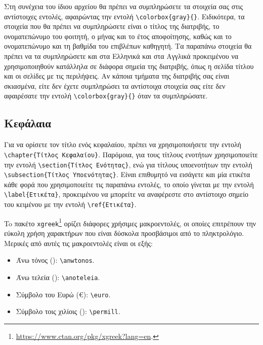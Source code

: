 Στη συνέχεια του ίδιου αρχείου θα πρέπει να συμπληρώσετε τα στοιχεία σας στις αντίστοιχες εντολές, αφαιρώντας την εντολή \verb|\colorbox{gray}{}|.
Ειδικότερα, τα στοιχεία που θα πρέπει να συμπληρώσετε είναι ο τίτλος της διατριβής, το ονοματεπώνυμο του φοιτητή, ο μήνας και το έτος αποφοίτησης, καθώς και το ονοματεπώνυμο και τη βαθμίδα του επιβλέπων καθηγητή.
Τα παραπάνω στοιχεία θα πρέπει να τα συμπληρώσετε και στα Ελληνικά και στα Αγγλικά προκειμένου να χρησιμοποιηθούν κατάλληλα σε διάφορα σημεία της διατριβής, όπως η σελίδα τίτλου και οι σελίδες με τις περιλήψεις.
Αν κάποια τμήματα της διατριβής σας είναι σκιασμένα, είτε δεν έχετε συμπληρώσει τα αντίστοιχα στοιχεία σας είτε δεν αφαιρέσατε την εντολή \verb|\colorbox{gray}{}| όταν τα συμπληρώσατε.

\subsection{Κεφάλαια}
\label{subsec:Chapters}
Για να ορίσετε τον τίτλο ενός κεφαλαίου, πρέπει να χρησιμοποιήσετε την εντολή \verb|\chapter{Τίτλος Κεφαλαίου}|.
Παρόμοια, για τους τίτλους ενοτήτων χρησιμοποιείτε την εντολή \verb|\section{Τίτλος Ενότητας}|, ενώ για τίτλους υποενοτήτων την εντολή \verb|\subsection{Τίτλος Υποενότητας}|.
Είναι επιθυμητό να εισάγετε και μία ετικέτα κάθε φορά που χρησιμοποιείτε τις παραπάνω εντολές, το οποίο γίνεται με την εντολή \verb|\label{Ετικέτα}|, προκειμένου να μπορείτε να αναφέρεστε στο αντίστοιχο σημείο του κειμένου με την εντολή \verb|\ref{Ετικέτα}|.

To πακέτο \texttt{xgreek}\footnote{\url{https://www.ctan.org/pkg/xgreek?lang=en}.} ορίζει διάφορες χρήσιμες μακροεντολές, οι οποίες επιτρέπουν την εύκολη χρήση χαρακτήρων που είναι δύσκολα προσβάσιμοι από το πληκτρολόγιο.
Μερικές από αυτές τις μακροεντολές είναι οι εξής:
\begin{itemize}
	\item Άνω τόνος (\anwtonos): \verb|\anwtonos|.
	\item Άνω τελεία (\anoteleia): \verb|\anoteleia|.
	\item Σύμβολο του Ευρώ (\euro): \verb|\euro|.
	\item Σύμβολο τοις χιλίοις (\permill): \verb|\permill|.
\end{itemize}

